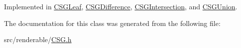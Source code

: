Implemented in \hyperlink{classCSGLeaf_aba3f65b725aa0a697664b9dda80b4df3}{C\+S\+G\+Leaf}, \hyperlink{classCSGDifference_aede15cd9fd46e4824e66361eb2f28ec9}{C\+S\+G\+Difference}, \hyperlink{classCSGIntersection_ad1f53a70c93dcdb6f8725a491fa24917}{C\+S\+G\+Intersection}, and \hyperlink{classCSGUnion_aaf1d2e77d8f931327fd8c499933142ba}{C\+S\+G\+Union}.



The documentation for this class was generated from the following file\+:\begin{DoxyCompactItemize}
\item 
src/renderable/\hyperlink{CSG_8h}{C\+S\+G.\+h}\end{DoxyCompactItemize}
